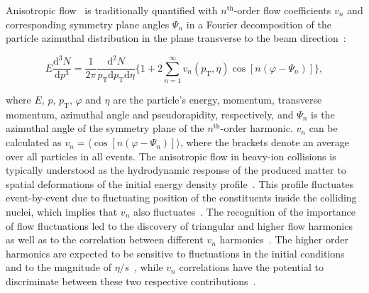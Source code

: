 Anisotropic flow~\cite{Ollitrault:1992bk} is traditionally quantified with $n^{\mathrm{th}}$-order flow coefficients $v_n$ and corresponding symmetry plane angles $\Psi_n$ in a Fourier decomposition of the particle azimuthal distribution in the plane transverse to the beam direction~\cite{Voloshin:1994mz}:

\begin{equation}
E\frac{\mathrm{d}^3N}{\mathrm{d}p^3} = \frac{1}{2\pi}\frac{\mathrm{d}^2N}{p_{\mathrm{T}}\mathrm{d}p_{\mathrm{T}}\mathrm{d}\eta} \Big\{1 + 2\sum_{n=1}^{\infty} v_n(p_{\mathrm{T}},\eta) \cos[n(\varphi - \Psi_n)]\Big\},
\label{Eq:Fourier}
\end{equation}

\noindent where $E$, $p$, $p_{\mathrm{T}}$, $\varphi$ and $\eta$ are the particle's energy, momentum, transverse momentum, azimuthal angle and pseudorapidity, respectively, and $\Psi_n$ is the azimuthal angle of the symmetry plane of the $n^{\mathrm{th}}$-order harmonic. $v_n$ can be calculated as $v_{n} = \langle{\cos[n(\varphi - \Psi_n)]}\rangle$, where the brackets denote an average over all particles in all events.
The anisotropic flow in heavy-ion collisions is typically understood as the hydrodynamic response of the produced matter to spatial deformations of the initial energy density profile~\cite{Floerchinger:2013tya}.
This profile fluctuates event-by-event due to fluctuating position of the constituents inside the colliding nuclei, which implies that $v_n$ also fluctuates~\cite{Miller:2003kd,Alver:2006wh}.
The recognition of the importance of flow fluctuations led to the discovery of triangular and higher flow harmonics~\cite{Alver:2010gr,ALICE:2011ab} as well as to the correlation between different $v_{n}$ harmonics~\cite{Niemi:2012aj,Aad:2014fla}.
The higher order harmonics are expected to be sensitive to fluctuations in the initial conditions and to the magnitude of $\eta/s$~\cite{Alver:2010dn,Luzum:2012wu}, while $v_{n}$ correlations have the potential to discriminate between these two respective contributions~\cite{Niemi:2012aj}.

